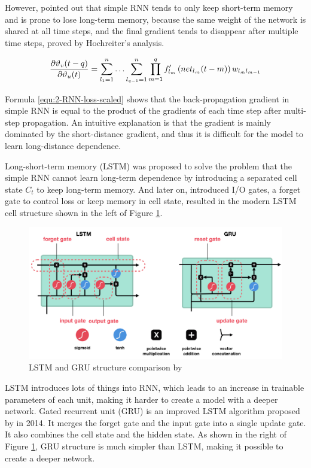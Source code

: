 However, \citet{hochreiter1997long} pointed out that simple RNN tends to only keep short-term memory and is prone to lose long-term memory, because the same weight of the network is shared at all time steps, and the final gradient tends to disappear after multiple time steps, proved by Hochreiter's analysis.

\begin{equation}
    \frac{\partial \vartheta_{v}(t-q)}{\partial \vartheta_{u}(t)}=\sum_{l_{1}=1}^{n} \ldots \sum_{l_{q-1}=1}^{n} \prod_{m=1}^{q} f_{l_{m}}^{\prime}\left(n e t_{l_{m}}(t-m)\right) w_{l_{m} l_{m-1}}
    \eqcite{hochreiter1997long}
    \label{equ:2-RNN-loss-scaled}
\end{equation}

Formula \ref{equ:2-RNN-loss-scaled} shows that the back-propagation gradient in simple RNN is equal to the product of the gradients of each time step after multi-step propagation.
An intuitive explanation is that the gradient is mainly dominated by the short-distance gradient, and thus it is difficult for the model to learn long-distance dependence.

Long-short-term memory (LSTM) was proposed to solve the problem that the simple RNN cannot learn long-term dependence by introducing a separated cell state $C_t$ to keep long-term memory. And later on, \citet{Gers2000LearningTF} introduced I/O gates, a forget gate to control loss or keep memory in cell state, resulted in the modern LSTM cell structure shown in the left of Figure \ref{fig:ext-LSTM-GRU}.

\begin{figure}[ht!]
    \centering
    \includegraphics[width=.9\textwidth]{literature/imgs/ext-LSTM-GRU.png}
    \caption{LSTM and GRU structure comparison by \citet{phi2018illustrated}}
    \label{fig:ext-LSTM-GRU}
\end{figure}

LSTM introduces lots of things into RNN, which leads to an increase in trainable parameters of each unit, making it harder to create a model with a deeper network.
Gated recurrent unit (GRU) is an improved LSTM algorithm proposed by \citet{chung2014empirical} in 2014. It merges the forget gate and the input gate into a single update gate. It also combines the cell state and the hidden state.
As shown in the right of Figure \ref{fig:ext-LSTM-GRU}, GRU structure is much simpler than LSTM, making it possible to create a deeper network.

